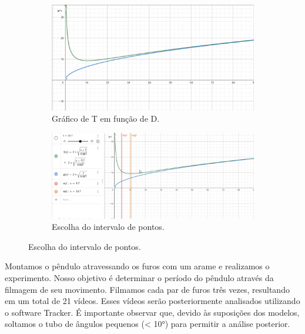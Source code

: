 \documentclass[hidelinks,a4paper,12pt]{article}
\begin{document}
\begin{figure}[H]
    \begin{subfigure}{0.5\textwidth }
        \centering
        \includegraphics[width=0.9\linewidth]{grafico1.png}
        \caption{Gráfico de T em função de D.}
        \label{fig:1.2}
    \end{subfigure}%
    \begin{subfigure}{0.5\textwidth }
        \centering
        \includegraphics[width=0.9\linewidth]{grafico2.png}
        \caption{Escolha do intervalo de pontos.}
        \label{fig: 1.3}
    \end{subfigure}
 \end{figure}


\qquad Montamos o pêndulo atravessando os furos com um arame e realizamos o experimento. Nosso objetivo é determinar o período do pêndulo através da filmagem de seu movimento. Filmamos cada par de furos três vezes, resultando em um total de 21 vídeos. Esses vídeos serão posteriormente analisados utilizando o software Tracker. É importante observar que, devido às suposições dos modelos, soltamos o tubo de ângulos pequenos (< 10°) para permitir a análise posterior.
\end{document}
